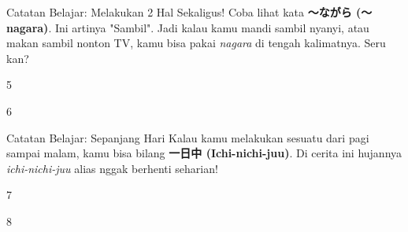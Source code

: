 \begin{lessonbox}{Catatan Belajar: Melakukan 2 Hal Sekaligus!}
    Coba lihat kata \textbf{〜ながら (〜nagara)}. Ini artinya "Sambil". Jadi kalau kamu mandi sambil nyanyi, atau makan sambil nonton TV, kamu bisa pakai \textit{nagara} di tengah kalimatnya. Seru kan?
\end{lessonbox}

\begin{convobox}{5}
    \noindent
      
      

    \vspace{1.5em}
\end{convobox}

\begin{convobox}{6}
    \noindent
     

    \vspace{1.5em}
\end{convobox}

\begin{lessonbox}{Catatan Belajar: Sepanjang Hari}
    Kalau kamu melakukan sesuatu dari pagi sampai malam, kamu bisa bilang \textbf{一日中 (Ichi-nichi-juu)}. Di cerita ini hujannya \textit{ichi-nichi-juu} alias nggak berhenti seharian!
\end{lessonbox}

\begin{convobox}{7}
    \noindent

    \vspace{1.5em}
\end{convobox}

\begin{convobox}{8}
    \noindent
      

    \vspace{1.5em}
\end{convobox}

